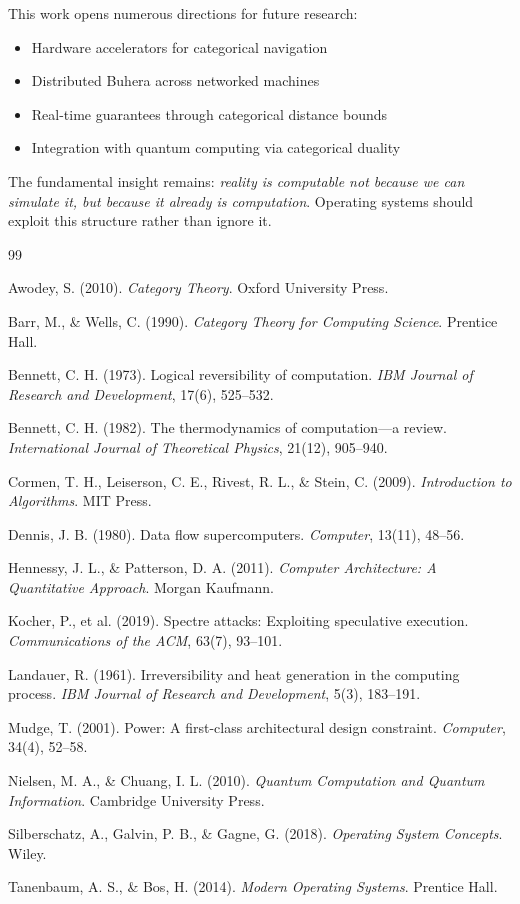 \documentclass[twocolumn,10pt]{article}
\theoremstyle{definition}
\theoremstyle{remark}
\begin{document}
This work opens numerous directions for future research:
\begin{itemize}
    \item Hardware accelerators for categorical navigation
    \item Distributed Buhera across networked machines
    \item Real-time guarantees through categorical distance bounds
    \item Integration with quantum computing via categorical duality
\end{itemize}

The fundamental insight remains: \emph{reality is computable not because we can simulate it, but because it already is computation}. Operating systems should exploit this structure rather than ignore it.


\begin{thebibliography}{99}

Awodey, S. (2010). \textit{Category Theory}. Oxford University Press.

Barr, M., \& Wells, C. (1990). \textit{Category Theory for Computing Science}. Prentice Hall.

Bennett, C. H. (1973). Logical reversibility of computation. \textit{IBM Journal of Research and Development}, 17(6), 525--532.

Bennett, C. H. (1982). The thermodynamics of computation—a review. \textit{International Journal of Theoretical Physics}, 21(12), 905--940.

Cormen, T. H., Leiserson, C. E., Rivest, R. L., \& Stein, C. (2009). \textit{Introduction to Algorithms}. MIT Press.

Dennis, J. B. (1980). Data flow supercomputers. \textit{Computer}, 13(11), 48--56.

Hennessy, J. L., \& Patterson, D. A. (2011). \textit{Computer Architecture: A Quantitative Approach}. Morgan Kaufmann.

Kocher, P., et al. (2019). Spectre attacks: Exploiting speculative execution. \textit{Communications of the ACM}, 63(7), 93--101.

Landauer, R. (1961). Irreversibility and heat generation in the computing process. \textit{IBM Journal of Research and Development}, 5(3), 183--191.

Mudge, T. (2001). Power: A first-class architectural design constraint. \textit{Computer}, 34(4), 52--58.

Nielsen, M. A., \& Chuang, I. L. (2010). \textit{Quantum Computation and Quantum Information}. Cambridge University Press.

Silberschatz, A., Galvin, P. B., \& Gagne, G. (2018). \textit{Operating System Concepts}. Wiley.

Tanenbaum, A. S., \& Bos, H. (2014). \textit{Modern Operating Systems}. Prentice Hall.

\end{thebibliography}
\end{document}
